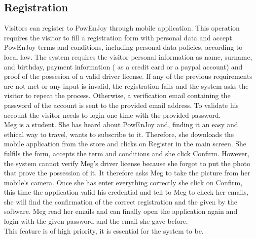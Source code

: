 \subsection{Registration}
Visitors can register to PowEnJoy through mobile application. This operation requires the visitor to fill a registration form with personal data and accept PowEnJoy terms and conditions, including personal data policies, according to local law. The system requires the visitor personal information as name, surname, and birthday, payment information ( as a credit card or a paypal account) and proof of the possesion of a valid driver license.
If any of the previous requirements are not met or any input is invalid, the registration fails and the system asks the visitor to repeat the process. Otherwise, a verification email containing the password of the account is sent to the provided email address. To validate his account the visitor needs to login one time with the provided password.
 \ \\
Meg is a student. She has heard about PowEnJoy and, finding it an easy and ethical way to travel, wants to subscribe to it.
Therefore, she downloads the mobile application from the store and clicks on Register in the main screen. She fulfils the form, accepts the term and conditions  and she click Confirm. However, the system cannot verify Meg's driver license because she forgot to put the photo that prove the possession of it. It therefore asks Meg to take the picture from her mobile's camera. Once she has enter everything correctly she click on Confirm, this time the application valid his credential and tell to Meg to check her emails, she will find the confirmation of the correct registration and the given by the software. Meg read her emails and can finally open the application again and login with the given password and the email she gave before.
 \ \\
This feature is of high priority, it is essential for the system to be.
